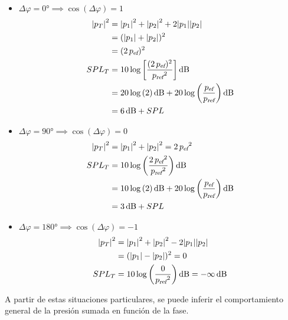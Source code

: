 \documentclass[a5paper,12pt,twoside]{book}
\begin{document}
\begin{itemize}
    \item {}
    $\Delta \varphi = \ang{0} \implies \cos(\Delta \varphi)=1$
    \begin{align*}
        \norm{p_T}^2 &= \norm{p_1}^2 + \norm{p_2}^2 + 2\norm{p_1} \norm{p_2}
        \\
        &= ( \norm{p_1} + \norm{p_2} )^2
        \\
        &= (2\,\rms{p})^2
        \\
        SPL_T &= 10 \log \left[ \frac{(2\,\rms{p})^2}{\sub{p}{ref}^2} \right] \si{\deci\bel}
        \\
        &= 20 \log \left( 2 \right) \si{\deci\bel} + 20 \log \left( \frac{\rms{p}}{\sub{p}{ref}} \right) \si{\deci\bel}
        \\
        &= 6\,\si{\deci\bel} + SPL
    \end{align*}
    
    \item {}
    $\Delta \varphi = \ang{90} \implies \cos(\Delta \varphi)=0$
    \begin{align*}
        \norm{p_T}^2 &= \norm{p_1}^2 + \norm{p_2}^2 = 2\,\rms{p}^2
        \\
        SPL_T &= 10 \log \left( \frac{2\,\rms{p}^2}{\sub{p}{ref}^2} \right) \si{\deci\bel}
        \\
        &= 10 \log \left( 2 \right) \si{\deci\bel} + 20 \log \left( \frac{\rms{p}}{\sub{p}{ref}} \right) \si{\deci\bel}
        \\
        &= 3\,\si{\deci\bel} + SPL
    \end{align*}
    
    \item {}
    $\Delta \varphi = \ang{180} \implies \cos(\Delta \varphi)=-1$
    \begin{align*}
        \norm{p_T}^2 &= \norm{p_1}^2 + \norm{p_2}^2 - 2\norm{p_1} \norm{p_2}
        \\
        &= ( \norm{p_1} - \norm{p_2} )^2 = 0
        \\
        SPL_T &= 10 \log \left( \frac{0}{\sub{p}{ref}^2} \right) \si{\deci\bel}
        = -\infty\,\si{\deci\bel}
\end{align*}
\end{itemize}

A partir de estas situaciones particulares, se puede inferir el comportamiento general de la presión sumada en función de la fase.
\end{document}
